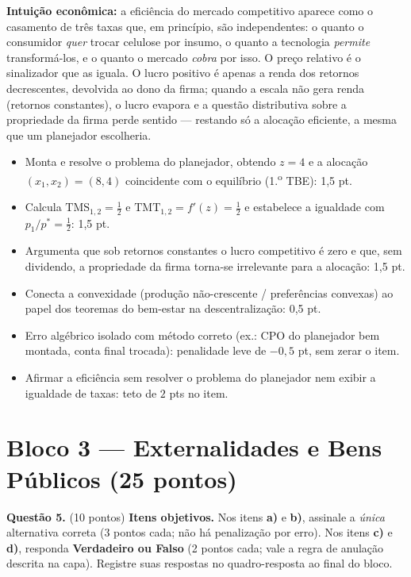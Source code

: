 \begin{solucao}
\textbf{Intuição econômica:} a eficiência do mercado competitivo aparece como o casamento de três taxas que, em princípio, são independentes: o quanto o consumidor \emph{quer} trocar celulose por insumo, o quanto a tecnologia \emph{permite} transformá-los, e o quanto o mercado \emph{cobra} por isso. O preço relativo é o sinalizador que as iguala. O lucro positivo é apenas a renda dos retornos decrescentes, devolvida ao dono da firma; quando a escala não gera renda (retornos constantes), o lucro evapora e a questão distributiva sobre a propriedade da firma perde sentido --- restando só a alocação eficiente, a mesma que um planejador escolheria.
\rubricalabel
\begin{itemize}
\item Monta e resolve o problema do planejador, obtendo $z=4$ e a alocação $(x_1,x_2)=(8,4)$ coincidente com o equilíbrio (1.\textsuperscript{o} TBE): 1{,}5 pt.
\item Calcula $\text{TMS}_{1,2}=\tfrac12$ e $\text{TMT}_{1,2}=f'(z)=\tfrac12$ e estabelece a igualdade com $p_1/p^{*}=\tfrac12$: 1{,}5 pt.
\item Argumenta que sob retornos constantes o lucro competitivo é zero e que, sem dividendo, a propriedade da firma torna-se irrelevante para a alocação: 1{,}5 pt.
\item Conecta a convexidade (produção não-crescente / preferências convexas) ao papel dos teoremas do bem-estar na descentralização: 0{,}5 pt.
\item Erro algébrico isolado com método correto (ex.: CPO do planejador bem montada, conta final trocada): penalidade leve de $-0{,}5$ pt, sem zerar o item.
\item Afirmar a eficiência sem resolver o problema do planejador nem exibir a igualdade de taxas: teto de $2$ pts no item.
\end{itemize}
\end{solucao}



\section*{Bloco 3 --- Externalidades e Bens Públicos \hfill \normalsize (25 pontos)}

\textbf{Questão 5.} (10 pontos) \textbf{Itens objetivos.} Nos itens \textbf{a)} e \textbf{b)}, assinale a \emph{única} alternativa correta (3 pontos cada; não há penalização por erro). Nos itens \textbf{c)} e \textbf{d)}, responda \textbf{Verdadeiro ou Falso} (2 pontos cada; vale a regra de anulação descrita na capa). Registre suas respostas no quadro-resposta ao final do bloco.

